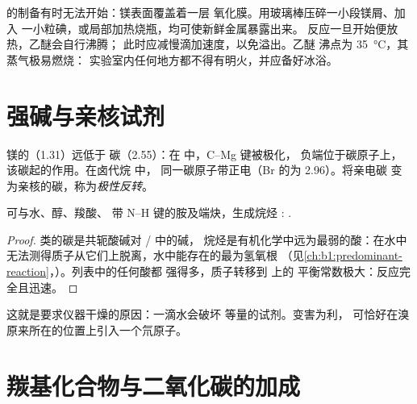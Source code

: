 \begin{inthelab}[必须先引发的反应]
的制备有时无法开始：镁表面覆盖着一层
氧化膜。用玻璃棒压碎一小段镁屑、加入
一小粒碘，或局部加热烧瓶，均可使新鲜金属暴露出来。
反应一旦开始便放热，乙醚会自行沸腾；
此时应减慢滴加速度，以免溢出。乙醚
沸点为 \qty{35}{\celsius}，其蒸气极易燃烧：
实验室内任何地方都不得有明火，并应备好冰浴。
\end{inthelab}

\section{强碱与亲核试剂}

\begin{definition}[极性反转]\label{def:b1:organomagnesium:umpolung}
镁的（1.31）远低于
碳（2.55）：在  中，C--Mg 键被极化，
负端位于碳原子上，该碳起的作用。在卤代烷  中，
同一碳原子带正电（Br 的为 2.96）。将亲电碳
变为亲核的碳，称为\emph{极性反转}。
\end{definition}

\begin{proposition}[格氏试剂会被酸性氢破坏]\label{prop:b1:organomagnesium:base}
可与水、醇、羧酸、
带 N--H 键的胺及端炔，生成烷烃
: .
\end{proposition}

\begin{proof}
类的碳是共轭酸碱对 / 中的碱，
烷烃是有机化学中远为最弱的酸：在水中
无法测得质子从它们上脱离，水中能存在的最为氢氧根
（见\cref{ch:b1:predominant-reaction}，）。列表中的任何酸都
强得多，质子转移到  上的
平衡常数极大：反应完全且迅速。
\end{proof}

这就是要求仪器干燥的原因：一滴水会破坏
等量的试剂。变害为利，
可恰好在溴原来所在的位置上引入一个氘原子。

\section{羰基化合物与二氧化碳的加成}

